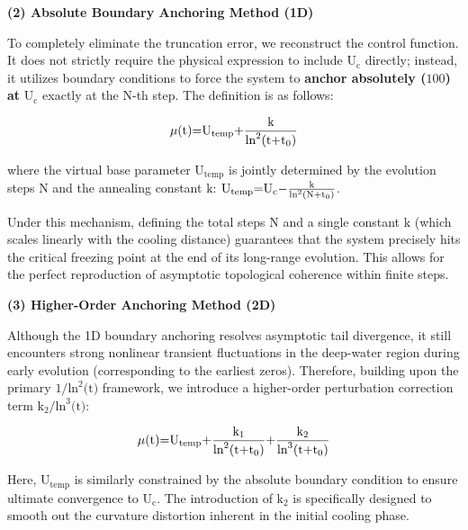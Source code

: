 \documentclass[fleqn,10pt]{wlscirep}
\begin{document}
\textbf{(2) Absolute Boundary Anchoring Method (1D)}

To completely eliminate the truncation error, we reconstruct the control
function. It does not strictly require the physical expression to
include \(\text{U}_{\text{c}}\) directly; instead, it utilizes boundary
conditions to force the system to \textbf{anchor absolutely
(}\(\text{100}\)\textbf{) at} \(\text{U}_{\text{c}}\) exactly at the
\(\text{N}\)-th step. The definition is as follows:

\[\text{\ensuremath{\mu}}\text{(}\text{t}\text{)=}\text{U}_{\text{temp}}\text{+}\frac{\text{k}}{\text{ln}^{\text{2}}\text{(}\text{t}\text{+}\text{t}_{\text{0}}\text{)}}\]

where the virtual base parameter \(\text{U}_{\text{temp}}\) is jointly
determined by the evolution steps \(\text{N}\) and the annealing
constant \(\text{k}\):
\(\text{U}_{\text{temp}}\text{=}\text{U}_{\text{c}}\text{\ensuremath{-}}\frac{\text{k}}{\text{ln}^{\text{2}}\text{(}\text{N}\text{+}\text{t}_{\text{0}}\text{)}}\).

Under this mechanism, defining the total steps \(\text{N}\) and a single
constant \(\text{k}\) (which scales linearly with the cooling distance)
guarantees that the system precisely hits the critical freezing point at
the end of its long-range evolution. This allows for the perfect
reproduction of asymptotic topological coherence within finite steps.

\textbf{(3) Higher-Order Anchoring Method (2D)}

Although the 1D boundary anchoring resolves asymptotic tail divergence,
it still encounters strong nonlinear transient fluctuations in the
deep-water region during early evolution (corresponding to the earliest
zeros). Therefore, building upon the primary
\(\text{1/}\text{ln}^{\text{2}}\text{(}\text{t}\text{)}\) framework, we
introduce a higher-order perturbation correction term
\(\text{k}_{\text{2}}\text{/}\text{ln}^{\text{3}}\text{(}\text{t}\text{)}\):

\[\text{\ensuremath{\mu}}\text{(}\text{t}\text{)=}\text{U}_{\text{temp}}\text{+}\frac{\text{k}_{\text{1}}}{\text{ln}^{\text{2}}\text{(}\text{t}\text{+}\text{t}_{\text{0}}\text{)}}\text{+}\frac{\text{k}_{\text{2}}}{\text{ln}^{\text{3}}\text{(}\text{t}\text{+}\text{t}_{\text{0}}\text{)}}\]

Here, \(\text{U}_{\text{temp}}\) is similarly constrained by the
absolute boundary condition to ensure ultimate convergence to
\(\text{U}_{\text{c}}\). The introduction of \(\text{k}_{\text{2}}\) is
specifically designed to smooth out the curvature distortion inherent in
the initial cooling phase.
\end{document}
